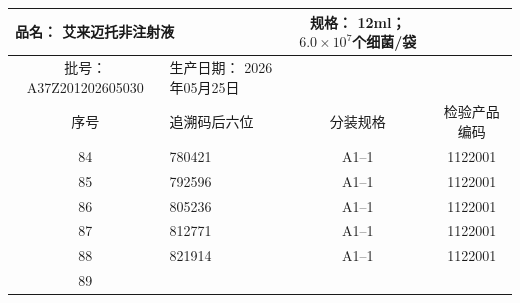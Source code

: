 \documentclass[UTF8,10pt,a4paper,fontset=fandol]{ctexart}
\newcommand{\fieldvalue}[1]{#1}
\begin{document}
\begin{center}
\small
\begin{tabular}{|c|l|c|c|}
\hline
\multicolumn{2}{|l|}{品名：%
\fieldvalue{艾来迈托非注射液}} &
规格：%
\fieldvalue{12ml；$6.0\times10^{7}$个细菌/袋}
\\ \hline
批号：%
\fieldvalue{A37Z201202605030} &
生产日期：%
\fieldvalue{2026年05月25日}
\\ \hline
序号 & 追溯码后六位 & 分装规格 & 检验产品编码 \\ \hline
\fieldvalue{84} &
\fieldvalue{780421} &
\fieldvalue{A1--1} &
\fieldvalue{1122001}
\\ \hline
\fieldvalue{85} &
\fieldvalue{792596} &
\fieldvalue{A1--1} &
\fieldvalue{1122001}
\\ \hline
\fieldvalue{86} &
\fieldvalue{805236} &
\fieldvalue{A1--1} &
\fieldvalue{1122001}
\\ \hline
\fieldvalue{87} &
\fieldvalue{812771} &
\fieldvalue{A1--1} &
\fieldvalue{1122001}
\\ \hline
\fieldvalue{88} &
\fieldvalue{821914} &
\fieldvalue{A1--1} &
\fieldvalue{1122001}
\\ \hline
\fieldvalue{89} &

\end{tabular}
\end{center}
\end{document}
